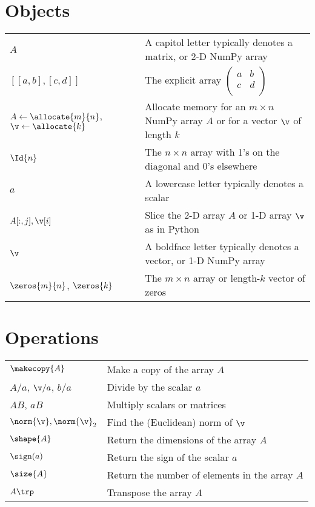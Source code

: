 \label{notation_index}

\section*{Objects}
\renewcommand{\arraystretch}{1.3}
\begin{tabular}{l l}
$A$ 					& A capitol letter typically denotes a matrix, or 2-D NumPy array\\
$[[a, b], [c, d]]$ 			& The explicit array $\left(\begin{array}{cc}
a & b\\
c & d\\\end{array}\right)$\\
$A \gets \allocate{m}{n}$, 
$\v \gets \allocate{k}$ 	& Allocate memory for an $m \times n$ NumPy array $A$
						or for a vector $\v$ of length $k$\\
$\Id{n}$	 			& The $n\times n$ array with 1's on the diagonal and 0's elsewhere \\
$a$ 					& A lowercase letter typically denotes a scalar\\

$A[:, j], \v[i]$ 			& Slice the 2-D array $A$ or 1-D array $\v$ as in Python\\
$\v$ 					& A boldface letter typically denotes a vector, or 1-D NumPy array\\
$\zeros{m}{n}$,
$\zeros{k}$	 		& The $m\times n$ array or length-$k$ vector of zeros 
\end{tabular}

\section*{Operations}
\begin{tabular}{l l}
$\makecopy{A}$		& Make a copy of the array $A$\\
$A/a$, $\v/a$, $b/a$ 		& Divide by the scalar $a$\\
$AB$, $aB$			& Multiply scalars or matrices\\
$\norm{\v}, \norm{\v}_2$ 		& Find the (Euclidean) norm of $\v$\\
$\shape{A}$			& Return the dimensions of the array $A$\\
$\sign(a)$				& Return the sign of the scalar $a$\\
$\size{A}$				& Return the number of elements in the array $A$\\
$A\trp$				& Transpose the array $A$
\end{tabular}

